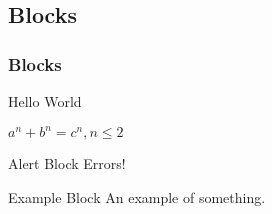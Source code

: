\documentclass{beamer}
\begin{document}
\subsection{Blocks}
\begin{frame}
\frametitle{Blocks}
\begin{definition}[Greetings]
Hello World
\end{definition}

\begin{theorem}
$a^n + b^n = c^n, n \leq 2$
\end{theorem}

\begin{alertblock}{Alert Block}
Errors!
\end{alertblock}

\begin{exampleblock}{Example Block}
An example of something.
\end{exampleblock}

\end{frame}
\end{document}
